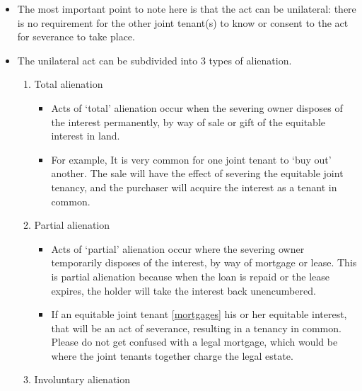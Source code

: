 \documentclass[
]{article}
\providecommand{\tightlist}{%
  \setlength{\itemsep}{0pt}\setlength{\parskip}{0pt}}
\begin{document}
\begin{enumerate}
\begin{enumerate}
    \begin{itemize}
    \tightlist
    \item
      The most important point to note here is that the act can be
      unilateral: there is no requirement for the other joint tenant(s)
      to know or consent to the act for severance to take place.
    \item
      The unilateral act can be subdivided into 3 types of alienation.

      \begin{enumerate}
      \def\labelenumiii{\arabic{enumiii}.}
      \tightlist
      \item
        Total alienation

        \begin{itemize}
        \tightlist
        \item
          Acts of `total' alienation occur when the severing owner
          disposes of the interest permanently, by way of sale or gift
          of the equitable interest in land.
        \item
          For example, It is very common for one joint tenant to `buy
          out' another. The sale will have the effect of severing the
          equitable joint tenancy, and the purchaser will acquire the
          interest as a tenant in common.
        \end{itemize}
      \item
        Partial alienation

        \begin{itemize}
        \tightlist
        \item
          Acts of `partial' alienation occur where the severing owner
          temporarily disposes of the interest, by way of mortgage or
          lease. This is partial alienation because when the loan is
          repaid or the lease expires, the holder will take the interest
          back unencumbered.
        \item
          If an equitable joint tenant
          {[}\protect\hyperlink{mortgages}{mortgages}{]} his or her
          equitable interest, that will be an act of severance,
          resulting in a tenancy in common. Please do not get confused
          with a legal mortgage, which would be where the joint tenants
          together charge the legal estate.
        \end{itemize}
      \item
        Involuntary alienation


\end{enumerate}
\end{itemize}
\end{enumerate}
\end{enumerate}
\end{document}
